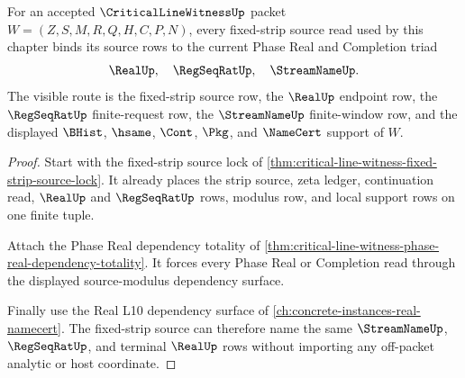 \begin{theorem}
\label{thm:critical-line-witness-phase-real-source-triad}
For an accepted $\CriticalLineWitnessUp$ packet $W=(Z,S,M,R,Q,H,C,P,N)$, every fixed-strip source read used by this chapter binds its source rows to the current Phase Real and Completion triad
$$
\RealUp,\quad \RegSeqRatUp,\quad \StreamNameUp.
$$
The visible route is the fixed-strip source row, the $\RealUp$ endpoint row, the $\RegSeqRatUp$ finite-request row, the $\StreamNameUp$ finite-window row, and the displayed $\BHist$, $\hsame$, $\Cont$, $\Pkg$, and $\NameCert$ support of $W$.
\end{theorem}
\begin{proof}
Start with the fixed-strip source lock of \autoref{thm:critical-line-witness-fixed-strip-source-lock}. It already places the strip source, zeta ledger, continuation read, $\RealUp$ and $\RegSeqRatUp$ rows, modulus row, and local support rows on one finite tuple.

Attach the Phase Real dependency totality of \autoref{thm:critical-line-witness-phase-real-dependency-totality}. It forces every Phase Real or Completion read through the displayed source-modulus dependency surface.

Finally use the Real L10 dependency surface of \autoref{ch:concrete-instances-real-namecert}. The fixed-strip source can therefore name the same $\StreamNameUp$, $\RegSeqRatUp$, and terminal $\RealUp$ rows without importing any off-packet analytic or host coordinate.
\end{proof}


